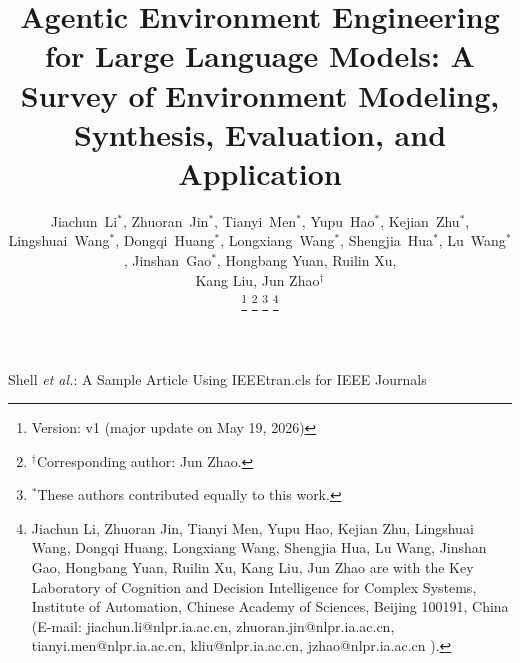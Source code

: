 \documentclass[10pt,journal,compsoc,x11names]{IEEEtran}
\begin{document}
\title{Agentic Environment Engineering for Large Language Models: A Survey of Environment Modeling, Synthesis, Evaluation, and Application}
% 

\author{
Jiachun~Li$^{*}$, 
Zhuoran~Jin$^{*}$, 
Tianyi~Men$^{*}$, 
Yupu~Hao$^{*}$, 
Kejian~Zhu$^{*}$,
Lingshuai~Wang$^{*}$, 
Dongqi~Huang$^{*}$, 
Longxiang~Wang$^{*}$,
Shengjia~Hua$^{*}$, 
Lu~Wang$^{*}$, 
Jinshan~Gao$^{*}$,
Hongbang Yuan,
Ruilin Xu,
\\
Kang Liu,
Jun Zhao$^\dagger$

\thanks{Version: v1 (major update on May 19, 2026)}
\thanks{$^\dagger$Corresponding author: Jun Zhao.}
\thanks{$^{*}$These authors contributed equally to this work.}
\thanks{Jiachun Li, Zhuoran Jin, Tianyi Men, Yupu Hao, Kejian Zhu, Lingshuai Wang, Dongqi Huang, Longxiang Wang, Shengjia Hua, Lu Wang, Jinshan Gao, Hongbang Yuan, Ruilin Xu, Kang Liu, Jun Zhao are with the Key Laboratory of Cognition and Decision Intelligence for Complex Systems, Institute of Automation, Chinese Academy of Sciences, Beijing 100191, China (E-mail: jiachun.li@nlpr.ia.ac.cn, zhuoran.jin@nlpr.ia.ac.cn, tianyi.men@nlpr.ia.ac.cn, kliu@nlpr.ia.ac.cn, jzhao@nlpr.ia.ac.cn ).}}


%
{Shell \MakeLowercase{\textit{et al.}}: A Sample Article Using IEEEtran.cls for IEEE Journals}





\maketitle
\end{document}
